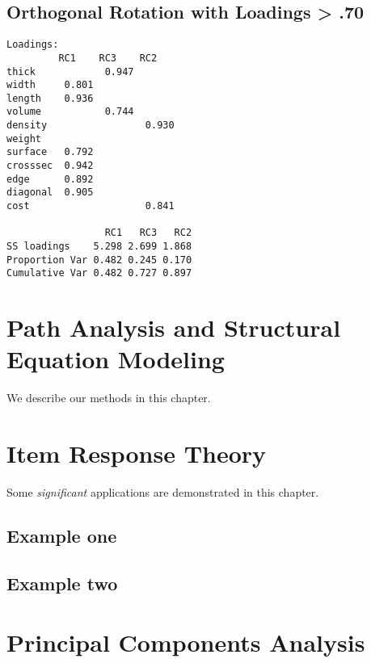 \documentclass[
]{book}
\begin{document}
\hypertarget{orthogonal-rotation-with-loadings-.70}{%
\section{Orthogonal Rotation with Loadings \textgreater{} .70}\label{orthogonal-rotation-with-loadings-.70}}

\footnotesize

\begin{verbatim}
Loadings:
         RC1    RC3    RC2   
thick            0.947       
width     0.801              
length    0.936              
volume           0.744       
density                 0.930
weight                       
surface   0.792              
crosssec  0.942              
edge      0.892              
diagonal  0.905              
cost                    0.841

                 RC1   RC3   RC2
SS loadings    5.298 2.699 1.868
Proportion Var 0.482 0.245 0.170
Cumulative Var 0.482 0.727 0.897
\end{verbatim}

\hypertarget{path-analysis-and-structural-equation-modeling}{%
\chapter{Path Analysis and Structural Equation Modeling}\label{path-analysis-and-structural-equation-modeling}}

We describe our methods in this chapter.

\hypertarget{item-response-theory}{%
\chapter{Item Response Theory}\label{item-response-theory}}

Some \emph{significant} applications are demonstrated in this chapter.

\hypertarget{example-one}{%
\section{Example one}\label{example-one}}

\hypertarget{example-two}{%
\section{Example two}\label{example-two}}

\hypertarget{principal-components-analysis-1}{%
\chapter{Principal Components Analysis}\label{principal-components-analysis-1}}
\end{document}
